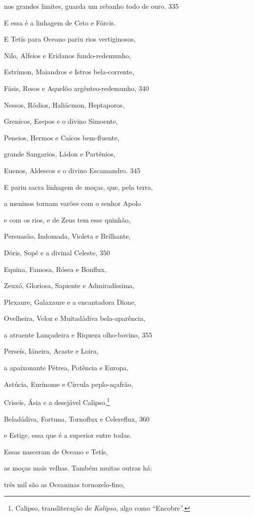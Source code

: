 nos grandes limites, guarda um rebanho todo de ouro. \num{335}

\medskip

E essa é a linhagem de Ceto e Fórcis.

E Tetís para Oceano pariu rios vertiginosos,

Nilo, Alfeios e Eridanos fundo-redemunho,

Estrímon, Maiandros e Istros bela-corrente,

Fásis, Resos e Aquelôo argênteo-redemunho, \num{340}

Nessos, Ródios, Haliácmon, Heptaporos,

Grenicos, Esepos e o divino Simoente,

Peneios, Hermos e Caícos bem-fluente,

grande Sangarios, Ládon e Partênios,

Euenos, Aldescos e o divino Escamandro. \num{345}

E pariu sacra linhagem de moças, que, pela terra,

a meninos tornam varões com o senhor Apolo

e com os rios, e de Zeus tem esse quinhão,

Persuasão, Indomada, Violeta e Brilhante,

Dóris, Sopé e a divinal Celeste, \num{350}

Equina, Famosa, Rósea e Bonflux,

Zeuxó, Gloriosa, Sapiente e Admiradíssima,

Plexaure, Galaxaure e a encantadora Dione,

Ovelheira, Veloz e Muitadádiva bela-aparência,

a atraente Lançadeira e Riqueza olho-bovino, \num{355}

Perseís, Iáneira, Acaste e Loira,

a apaixonante Pétrea, Potência e Europa,

Astúcia, Eurínome e Círcula peplo-açafrão,

Criseís, Ásia e a desejável Calipso,\footnote{Calipso, transliteração de \emph{Kalipso}, algo como ``Encobre''.}

Beladádiva, Fortuna, Tornoflux e Celereflux, \num{360}

e Estige, essa que é a superior entre todas.

Essas nasceram de Oceano e Tetís,

as moças mais velhas. Também muitas outras há:

três mil são as Oceaninas tornozelo-fino,

